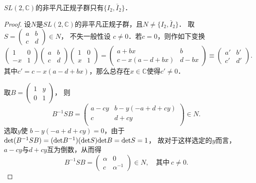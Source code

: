 \begin{proposition}
    $SL(2,\mathbb{C})$的非平凡正规子群只有$\{I_2,\bar{I}_2\}$．
\end{proposition}
\begin{proof}
    设$N$是$SL(2,\mathbb{C})$的非平凡正规子群，且$N \neq  \{I_2,\bar{I}_2\}$．
    取$S=\left(\begin{smallmatrix}   a & b \\ c & d \end{smallmatrix}\right) \in N$，
    不失一般性设 $c \neq 0$．若$c=0$，则作如下变换
    \begin{equation*}
        \begin{pmatrix}  1 & 0 \\ -x & 1 \end{pmatrix} \begin{pmatrix} a & b \\ c & d  \end{pmatrix} 
        \begin{pmatrix}  1 & 0 \\ x & 1 \end{pmatrix}=\begin{pmatrix} a+bx & b  \\ c-x(a-d+bx) & d-bx  \end{pmatrix} 
        \equiv \begin{pmatrix} a' & b' \\ c' & d' \end{pmatrix}  .
    \end{equation*}
    其中$c'=c-x(a-d+bx)$，那么总存在$x\in\mathbb{C}$使得$c'\neq 0$．
    
    取$B=\left(\begin{smallmatrix} 1 & y \\ 0 & 1 \end{smallmatrix}\right)$， 则
    \begin{equation*}
        B^{-1} S B=\begin{pmatrix} 
            a-c y & b-y (-a+d+c y) \\
            c & d+c y \\
        \end{pmatrix} \in N .
    \end{equation*}
    选取$y$使 $b-y (-a+d+c y)=0$，由于
    ${\rm det}(B^{-1} S B)=({\rm det}B^{-1}) ({\rm det} S) {\rm det}B={\rm det}S=1$，
    故对于这样选定的$y$而言，$a-c y$与$d+c y$互为倒数，从而得
    \begin{equation*}
        B^{-1} S B=\begin{pmatrix} 
            \alpha & 0 \\
            c & \alpha^{-1}
        \end{pmatrix} \in N,\quad \text{其中}\  c \neq 0 .
    \end{equation*}
    

\end{proof}
